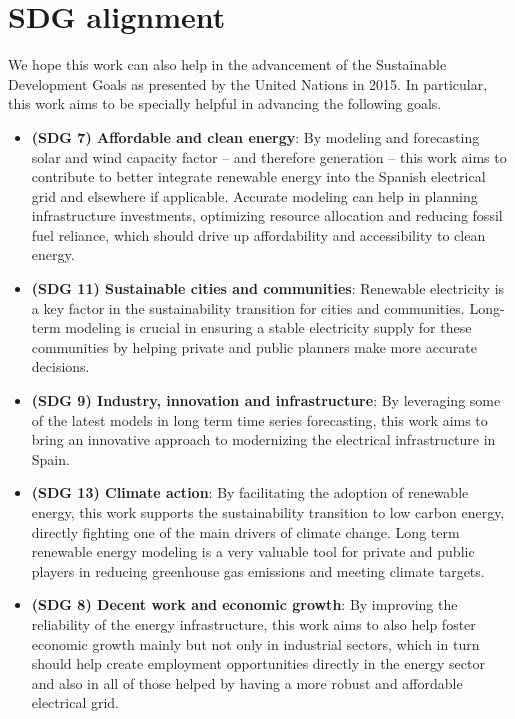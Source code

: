 \section{SDG alignment}
We hope this work can also help in the advancement of the Sustainable Development Goals as presented by the United Nations in 2015. In particular, this work aims to be specially helpful in advancing the following goals.

\begin{itemize}
    \item \textbf{(SDG 7) Affordable and clean energy}: By modeling and forecasting solar and wind capacity factor -- and therefore generation -- this work aims to contribute to better integrate renewable energy into the Spanish electrical grid and elsewhere if applicable. Accurate modeling can help in planning infrastructure investments, optimizing resource allocation and reducing fossil fuel reliance, which should drive up affordability and accessibility to clean energy.
    \item \textbf{(SDG 11) Sustainable cities and communities}: Renewable electricity is a key factor in the sustainability transition for cities and communities. Long-term modeling is crucial in ensuring a stable electricity supply for these communities by helping private and public planners make more accurate decisions.
    \item \textbf{(SDG 9) Industry, innovation and infrastructure}: By leveraging some of the latest models in long term time series forecasting, this work aims to bring an innovative approach to modernizing the electrical infrastructure in Spain.
    \item \textbf{(SDG 13) Climate action}: By facilitating the adoption of renewable energy, this work supports the sustainability transition to low carbon energy, directly fighting one of the main drivers of climate change. Long term renewable energy modeling is a very valuable tool for private and public players in reducing greenhouse gas emissions and meeting climate targets.
    \item \textbf{(SDG 8) Decent work and economic growth}: By improving the reliability of the energy infrastructure, this work aims to also help foster economic growth mainly but not only in industrial sectors, which in turn should help create employment opportunities directly in the energy sector and also in all of those helped by having a more robust and affordable electrical grid.
\end{itemize}